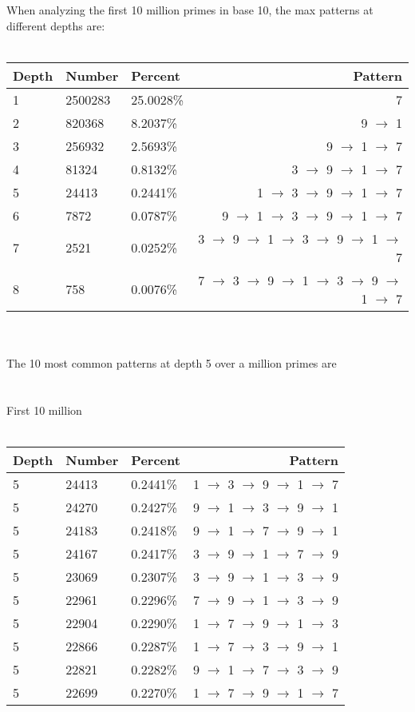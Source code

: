 \documentclass[13pt]{article}
\begin{document}
When analyzing the first 10 million primes in base 10, the max patterns at different depths are:\\\\
\begin{tabular}{ l l l r }
  Depth & Number & Percent & Pattern \\
  \hline
  1 & 2500283 & 25.0028\% & 7\\
  2 & 820368 & 8.2037\% & 9 $\rightarrow$ 1\\
  3 & 256932 & 2.5693\% & 9 $\rightarrow$ 1 $\rightarrow$ 7\\
  4 & 81324 & 0.8132\% & 3 $\rightarrow$ 9 $\rightarrow$ 1 $\rightarrow$ 7\\
  5 & 24413 & 0.2441\% & 1 $\rightarrow$ 3 $\rightarrow$ 9 $\rightarrow$ 1 $\rightarrow$ 7\\
  6 & 7872 & 0.0787\% & 9 $\rightarrow$ 1 $\rightarrow$ 3 $\rightarrow$ 9 $\rightarrow$ 1 $\rightarrow$ 7\\
  7 & 2521 & 0.0252\% & 3 $\rightarrow$ 9 $\rightarrow$ 1 $\rightarrow$ 3 $\rightarrow$ 9 $\rightarrow$ 1 $\rightarrow$ 7\\
  8 & 758 & 0.0076\% & 7 $\rightarrow$ 3 $\rightarrow$ 9 $\rightarrow$ 1 $\rightarrow$ 3 $\rightarrow$ 9 $\rightarrow$ 1 $\rightarrow$ 7\\
  \end{tabular}
\\\\The 10 most common patterns at depth 5 over a million primes are\\\\
\\First 10 million\\\\
\begin{tabular}{ l l l r }
  Depth & Number & Percent & Pattern \\
  \hline
    5 & 24413 & 0.2441\% & 1 $\rightarrow$ 3 $\rightarrow$ 9 $\rightarrow$ 1 $\rightarrow$ 7\\
    5 & 24270 & 0.2427\% & 9 $\rightarrow$ 1 $\rightarrow$ 3 $\rightarrow$ 9 $\rightarrow$ 1\\
    5 & 24183 & 0.2418\% & 9 $\rightarrow$ 1 $\rightarrow$ 7 $\rightarrow$ 9 $\rightarrow$ 1\\
    5 & 24167 & 0.2417\% & 3 $\rightarrow$ 9 $\rightarrow$ 1 $\rightarrow$ 7 $\rightarrow$ 9\\
    5 & 23069 & 0.2307\% & 3 $\rightarrow$ 9 $\rightarrow$ 1 $\rightarrow$ 3 $\rightarrow$ 9\\
    5 & 22961 & 0.2296\% & 7 $\rightarrow$ 9 $\rightarrow$ 1 $\rightarrow$ 3 $\rightarrow$ 9\\
    5 & 22904 & 0.2290\% & 1 $\rightarrow$ 7 $\rightarrow$ 9 $\rightarrow$ 1 $\rightarrow$ 3\\
    5 & 22866 & 0.2287\% & 1 $\rightarrow$ 7 $\rightarrow$ 3 $\rightarrow$ 9 $\rightarrow$ 1\\
    5 & 22821 & 0.2282\% & 9 $\rightarrow$ 1 $\rightarrow$ 7 $\rightarrow$ 3 $\rightarrow$ 9\\
    5 & 22699 & 0.2270\% & 1 $\rightarrow$ 7 $\rightarrow$ 9 $\rightarrow$ 1 $\rightarrow$ 7\\
  \end{tabular}
\end{document}
